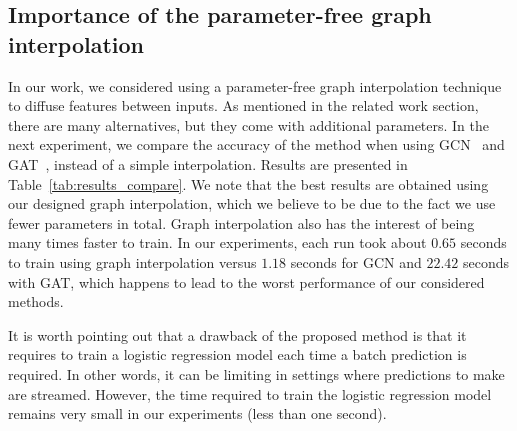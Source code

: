 \documentclass[a4paper,conference]{IEEEtran}
\begin{document}
\subsection{Importance of the parameter-free graph interpolation}

In our work, we considered using a parameter-free graph interpolation technique to diffuse features between inputs. As mentioned in the related work section, there are many alternatives, but they come with additional parameters. In the next experiment, we compare the accuracy of the method when using GCN~\cite{kipf2016semi} and GAT~\cite{velivckovic2017graph}, instead of a simple interpolation. Results are presented in Table~\ref{tab:results_compare}. We note that the best results are obtained using our designed graph interpolation, which we believe to be due to the fact we use fewer parameters in total. Graph interpolation also has the interest of being many times faster to train. In our experiments, each run took about $0.65$ seconds to train using graph interpolation versus $1.18$ seconds for GCN and $22.42$ seconds with GAT, which happens to lead to the worst performance of our considered methods.

It is worth pointing out that a drawback of the proposed method is that it requires to train a logistic regression model each time a batch prediction is required. In other words, it can be limiting in settings where predictions to make are streamed. However, the time required to train the logistic regression model remains very small in our experiments (less than one second).

\begin{table}
    \caption{1-shot and 5-shot accuracy on miniImageNet, when using the WRN backbone and various Graph Neural Networks. We use the same hyperparameters as Table~\ref{tab:results} and apply them to all methods (with the exception of $\kappa$ for GCN and GAT).}
    \centering

    \label{tab:results_compare}
\end{table}
\end{document}
